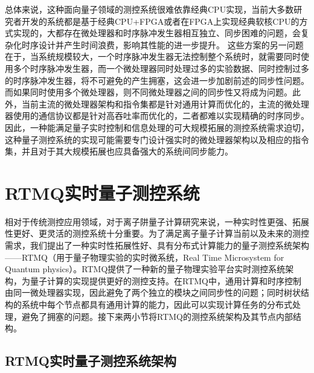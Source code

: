 总体来说，这种面向量子领域的测控系统很难依靠经典CPU实现，当前大多数研究者开发的系统都是基于经典CPU+FPGA或者在FPGA上实现经典软核CPU的方式实现的，大都存在微处理器和时序脉冲发生器相互独立、同步困难的问题，会复杂化时序设计并产生时间浪费，影响其性能的进一步提升。
这些方案的另一问题在于，当系统规模较大，一个时序脉冲发生器无法控制整个系统时，就需要同时使用多个时序脉冲发生器，而一个微处理器同时处理过多的实验数据、同时控制过多的时序脉冲发生器，将不可避免的产生拥塞，这会进一步加剧前述的同步性问题。而如果同时使用多个微处理器，则不同微处理器之间的同步性又将成为问题。此外，当前主流的微处理器架构和指令集都是针对通用计算而优化的，主流的微处理器使用的通信协议都是针对高吞吐率而优化的，二者都难以实现精确的时序同步。因此，一种能满足量子实时控制和信息处理的可大规模拓展的测控系统需求迫切，这种量子测控系统的实现可能需要专门设计强实时的微处理器架构以及相应的指令集，并且对于其大规模拓展也应具备强大的系统间同步能力。




\section[RTMQ实时量子测控系统]{RTMQ实时量子测控系统\label{section:rtmq_structure}}

相对于传统测控应用领域，对于离子阱量子计算研究来说，一种实时性更强、拓展性更好、更灵活的测控系统十分重要。为了满足离子量子计算当前以及未来的测控需求，我们提出了一种实时性拓展性好、具有分布式计算能力的量子测控系统架构——RTMQ（用于量子物理实验的实时微系统，Real Time Microsystem for Quantum physics）。RTMQ提供了一种新的量子物理实验平台实时测控系统架构，为量子计算的实现提供更好的测控支持。在RTMQ中，通用计算和时序控制由同一微处理器实现，因此避免了两个独立的模块之间同步性的问题；同时树状结构的系统中每个节点都具有通用计算的能力，因此可以实现计算任务的分布式处理，避免了拥塞的问题\cite[]{junhua01}。接下来两小节将RTMQ的测控系统架构及其节点内部结构。


\subsection[RTMQ实时量子测控系统架构]{RTMQ实时量子测控系统架构\label{section:rtmq_architecture}}

